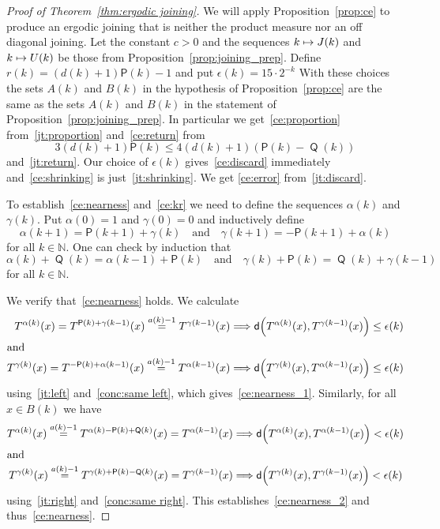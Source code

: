 \documentclass[10pt]{amsart}
\theoremstyle{definition}\newtheorem{defi}[theo]{Definition}\newtheorem{rema}[theo]{Remark}\newtheorem{exam}[theo]{Example}\newtheorem{exem}[theo]{Example}\newtheorem{nota}[theo]{Notation}
\DeclareMathOperator{\Q}{\mathsf{Q}}
\newcommand{\N}{\mathbb{N}}
\newcommand{\metric}{\mathsf{d}}
\renewcommand{\P}{\mathsf{P}}
\let\originalleft\left
\let\originalright\right
\renewcommand{\left}{\mathopen{}\mathclose\bgroup\originalleft}
\renewcommand{\right}{\aftergroup\egroup\originalright}
\let\oldmapsto\mapsto
\renewcommand*{\mapsto}{\mathchoice{\longmapsto}{\oldmapsto}{\oldmapsto}{\oldmapsto}}
\renewcommand*{\implies}{\mathchoice{\Longrightarrow}{\Rightarrow}{\Rightarrow}{\Rightarrow}}
\begin{document}
\begin{proof}[Proof of Theorem~\ref{thm:ergodic joining}]
We will apply Proposition~\ref{prop:ce} to produce an ergodic joining that is neither the product measure nor an off diagonal joining. Let the constant $c > 0$ and the sequences $k \mapsto J(k)$ and $k \mapsto U(k)$ be those from Proposition~\ref{prop:joining_prep}. Define $r(k) = (d(k)+1) \P(k) -1$ and put $\epsilon(k) = 15 \cdot 2^{-k}$ With these choices the sets $A(k)$ and $B(k)$ in the hypothesis of Proposition~\ref{prop:ce} are the same as the sets $A(k)$ and $B(k)$ in the statement of Proposition~\ref{prop:joining_prep}. In particular we get~\eqref{ce:proportion} from~\eqref{jt:proportion} and~\eqref{ce:return} from
\[
3(d(k)+1) \P(k) \le 4(d(k)+1) (\P(k) - \Q(k))
\]
and~\eqref{jt:return}. Our choice of $\epsilon(k)$ gives~\eqref{ce:discard} immediately and~\eqref{ce:shrinking} is just~\eqref{jt:shrinking}. We get \eqref{ce:error} from~\eqref{jt:discard}.

To establish~\eqref{ce:nearness} and~\eqref{ce:kr} we need to define the sequences $\alpha(k)$ and $\gamma(k)$. Put $\alpha(0) = 1$ and $\gamma(0) = 0$ and inductively define
\[
\alpha(k+1) = \P(k+1) + \gamma(k)
\quad\text{and}\quad
\gamma(k+1) = - \P(k+1) + \alpha(k)
\]
for all $k \in \N$. One can check by induction that
\begin{equation}\label{eqn:joining_tower_relations}
\alpha(k) + \Q(k) = \alpha(k-1) + \P(k)
\quad\text{and}\quad
\gamma(k) + \P(k) = \Q(k) + \gamma(k-1)
\end{equation}
for all $k \in \N$.

We verify that~\eqref{ce:nearness} holds. We calculate
\begin{align*}
T^{\alpha(k)}(x) = T^{\P(k) + \gamma(k-1)}(x) \overset{a(k)-1}{=} T^{\gamma(k-1)}(x)
&\implies
\metric\left(T^{\alpha(k)}(x), T^{\gamma(k-1)}(x)\right) \le \epsilon(k)
\\
\intertext{and}
T^{\gamma(k)}(x) = T^{-\P(k) + \alpha(k-1)}(x) \overset{a(k)-1}{=} T^{\alpha(k-1)}(x)
&\implies
\metric\left(T^{\gamma(k)}(x), T^{\alpha(k-1)}(x)\right) \le \epsilon(k)
\end{align*}
using~\eqref{jt:left} and~\eqref{conc:same left}, which gives~\eqref{ce:nearness_1}. Similarly, for all $x \in B(k)$ we have
\begin{align*}
T^{\alpha(k)}(x) \overset{a(k)-1}{=} T^{\alpha(k) - \P(k) + \Q(k)}(x) = T^{\alpha(k-1)}(x)
&\implies
\metric\left(T^{\alpha(k)}(x), T^{\alpha(k-1)}(x)\right) < \epsilon(k)
\\
\intertext{and}
T^{\gamma(k)}(x) \overset{a(k)-1}{=} T^{\gamma(k) + \P(k) - \Q(k)}(x) = T^{\gamma(k-1)}(x)
&\implies
\metric\left(T^{\gamma(k)}(x), T^{\gamma(k-1)}(x)\right) < \epsilon(k)
\end{align*}
using~\eqref{jt:right} and~\eqref{conc:same right}. This establishes~\eqref{ce:nearness_2} and thus~\eqref{ce:nearness}.%



\end{proof}
\end{document}
